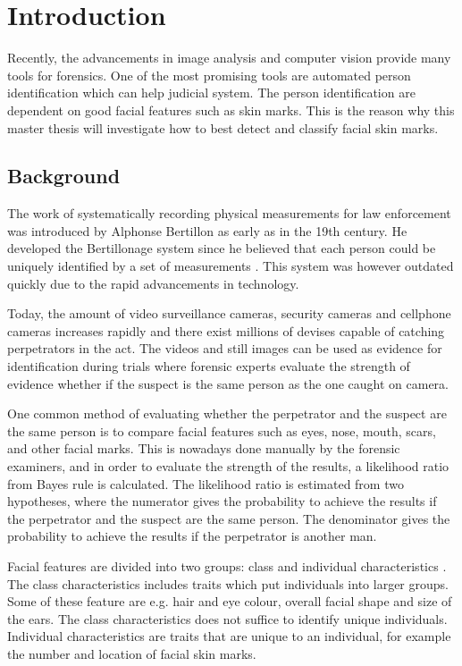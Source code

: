 \chapter{Introduction}\label{cha:intro}

Recently, the advancements in image analysis and computer vision provide many tools for forensics. One of the most promising tools are automated person identification which can help judicial system. The person identification are dependent on good facial features such as skin marks. This is the reason why this master thesis will investigate how to best detect and classify facial skin marks. 

\section{Background}

The work of systematically recording physical measurements for law enforcement was introduced by Alphonse Bertillon as early as in the 19th century. He developed the Bertillonage system since he believed that each person could be uniquely identified by a set of measurements \cite{Bertillon}. This system was however outdated quickly due to the rapid advancements in technology.

Today, the amount of video surveillance cameras, security cameras and cellphone cameras increases rapidly and there exist millions of devises capable of catching perpetrators in the act. The videos and still images can be used as evidence for identification during trials where forensic experts evaluate the strength of evidence whether if the suspect is the same person as the one caught
on camera.

One common method of evaluating whether the perpetrator and the suspect are the same person is to compare facial features such as eyes, nose, mouth, scars, and other facial marks. This is nowadays done manually \cite{face_soft} by the forensic examiners, and in order to evaluate the strength of the results, a likelihood ratio \cite{NFC_stat} from Bayes rule is calculated. The likelihood ratio is estimated from two hypotheses, where the numerator gives the probability to achieve the results if the perpetrator and the suspect are the same person. The denominator gives the probability to achieve the results if the perpetrator is another man. 

Facial features are divided into two groups: class and individual characteristics \cite{forensic_identification}. The class characteristics includes traits which put individuals into larger groups. Some of these feature are e.g. hair and eye colour, overall facial shape and size of the ears. The class characteristics does not suffice to identify unique individuals. Individual characteristics are traits that are unique to an individual, for example the number and location of facial skin marks.

